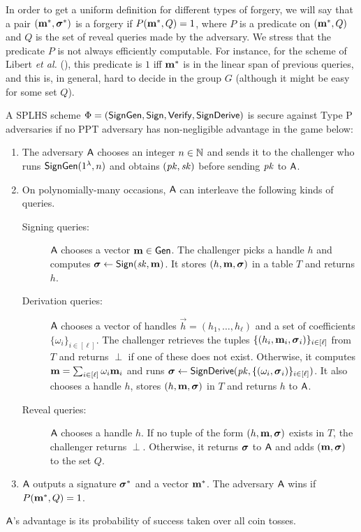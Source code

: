 \label{splhs-unforgeability}

In order to get a uniform definition for different types of forgery, we will say that a pair
$(\mathbf{m}^*,{\boldsymbol \sigma}^*)$ is a forgery if $P(\mathbf{m}^*, Q)=1$, where
$P$ is a predicate on $(\mathbf{m}^*, Q)$ and $Q$ is the set of reveal queries
made by the adversary. We stress that the predicate $P$ is not always efficiently computable. For instance, for the scheme of Libert \textit{et al.} (\cite{C:LPJY13}), this predicate is $1$ iff $\mathbf{m}^*$ is in the linear span of 
previous queries, and this is, in general, hard to decide in the group $G$ (although it might be easy for some set $Q$).  

\begin{definition} A SPLHS scheme $\Phi = (\mathsf{SignGen}, \mathsf{Sign}, \mathsf{Verify}, \mathsf{SignDerive})$ is secure against Type P adversaries if no PPT
adversary has non-negligible advantage in the game below:
\begin{enumerate}
\item The adversary $\mathsf{A}$ chooses an integer $n \in \mathbb{N}$ and sends it to the challenger who runs
$\mathsf{SignGen}(1^\lambda, n)$
and obtains $(\mathit{pk},\mathit{sk})$ before sending $\mathit{pk}$ to $\mathsf{A}$.
\item On polynomially-many occasions, $\mathsf{A}$ can interleave the following kinds of queries.
\begin{description}

\item[Signing queries:] $\mathsf{A}$ chooses a vector $\mathbf{m}\in\mathsf{Gen}$.
The challenger picks a handle
$h$ and computes ${\boldsymbol \sigma}\gets\mathsf{Sign}(\mathit{sk}, \mathbf{m})$. It stores $(h,\mathbf{m}, {\boldsymbol \sigma})$
in a table $T$ and returns $h$.

\item[Derivation queries:] $\mathsf{A}$ chooses a vector of handles $\vec{h} = (h_1, \ldots , h_\ell)$ and a set of coefficients
$\{\omega_i\}_{i\in[\ell]}$. The challenger retrieves the tuples $\{(h_i,\mathbf{m}_i, {\boldsymbol \sigma}_i)\}_{i\in[\ell]}$
from $T$ and returns $\perp$ if one
of these does not exist. Otherwise, it computes
$\mathbf{m} = \sum_{i\in[\ell]} \omega_i\mathbf{m}_i$ and runs
${\boldsymbol \sigma}\gets\mathsf{SignDerive}(\mathit{pk},\{(\omega_i,{\boldsymbol \sigma}_i)\}_{i\in[\ell]})$.
It also chooses a handle $h$, stores $(h,\mathbf{m}, {\boldsymbol \sigma})$ in $T$ and returns $h$
to $\mathsf{A}$.

\item[Reveal queries:] $\mathsf{A}$ chooses a handle $h$. If no tuple of the form $(h,\mathbf{m},{\boldsymbol \sigma})$
exists in $T$, the challenger returns $\perp$. Otherwise, it returns ${\boldsymbol \sigma}$
to $\mathsf{A}$ and adds $(\mathbf{m}, {\boldsymbol \sigma})$ to the set $Q$.
\end{description}

\item $\mathsf{A}$ outputs a signature ${\boldsymbol \sigma}^*$ and a vector $\mathbf{m}^*$.
The adversary $\mathsf{A}$ wins if $P(\mathbf{m}^*,Q)=1$.
\end{enumerate}
$\mathsf{A}$’s advantage is its probability of success taken over all coin tosses.
\end{definition}

